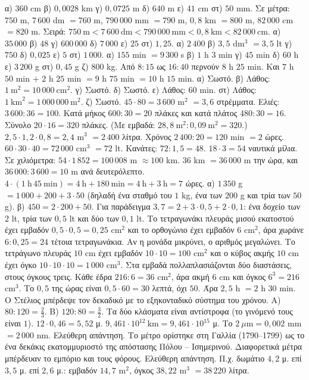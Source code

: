  α) $360$ cm \quad β) $0{,}0028$ km \quad γ) $0{,}0725$ m \quad δ) $640$ m \quad ε) $41$ cm \quad στ) $50$ mm.
 Σε μέτρα: $750$ m, $7\,600$ dm $=760$ m, $790\,000$ mm $=790$ m, $0{,}8$ km $=800$ m, $82\,000$ cm $=820$ m. Σειρά: $750\ \mathrm{m}<7\,600\ \mathrm{dm}<790\,000\ \mathrm{mm}<0{,}8\ \mathrm{km}<82\,000\ \mathrm{cm}$.
 α) $35\,000$ \quad β) $48$ \quad γ) $600\,000$ \quad δ) $7\,000$ \quad ε) $25$ \quad στ) $1{,}25$.
 α) $2\,400$ \quad β) $3{,}5$ dm$^3$ $=3{,}5$ lt \quad γ) $750$ \quad δ) $0{,}025$ \quad ε) $5$ \quad στ) $1\,000$.
 α) $155$ min $=9\,300$ s \quad β) $1$ h $3$ min \quad γ) $45$ min \quad δ) $60$ h \quad ε) $3\,200$ g \quad στ) $0{,}45$ g \quad ζ) $800$ kg.
 Από $8{:}15$ ως $16{:}40$ περνούν $8$ h $25$ min. Και $7$ h $50$ min $+$ $2$ h $25$ min $=9$ h $75$ min $=10$ h $15$ min.
 α) Σωστό. β) Λάθος: $1\ \mathrm{m}^2=10\,000\ \mathrm{cm}^2$. γ) Σωστό. δ) Σωστό. ε) Λάθος: $60$ min. στ) Λάθος: $1\ \mathrm{km}^2=1\,000\,000\ \mathrm{m}^2$. ζ) Σωστό.
 $45\cdot80=3\,600$ m$^2$ $=3{,}6$ στρέμματα. Ελιές: $3\,600:36=100$.
 Κατά μήκος $600:30=20$ πλάκες και κατά πλάτος $480:30=16$. Σύνολο $20\cdot16=320$ πλάκες. (Με εμβαδά: $28{,}8\ \mathrm{m}^2:0{,}09\ \mathrm{m}^2=320$.)
 $2{,}5\cdot1{,}2\cdot0{,}8=2{,}4$ m$^3$ $=2\,400$ λίτρα. Χρόνος $2\,400:20=120$ min $=2$ ώρες.
 $60\cdot30\cdot40=72\,000$ cm$^3$ $=72$ lt. Κανάτες: $72:1{,}5=48$.
 $18\cdot3=54$ ναυτικά μίλια. Σε χιλιόμετρα: $54\cdot1\,852=100\,008$ m $\approx100$ km.
 $36$ km $=36\,000$ m την ώρα, και $36\,000:3\,600=10$ m ανά δευτερόλεπτο.
 $4\cdot(1\ \mathrm{h}\,45\ \mathrm{min})=4\ \mathrm{h}+180\ \mathrm{min}=4\ \mathrm{h}+3\ \mathrm{h}=7$ ώρες.
 α) $1\,350$ g $=1\,000+200+3\cdot50$ (δηλαδή ένα σταθμό του $1$ kg, ένα των $200$ g και τρία των $50$ g). β) $450=2\cdot200+50$.
 Για παράδειγμα $3{,}7=2+3\cdot0{,}5+2\cdot0{,}1$: ένα δοχείο των $2$ lt, τρία των $0{,}5$ lt και δύο των $0{,}1$ lt.
 Το τετραγωνάκι πλευράς μισού εκατοστού έχει εμβαδόν $0{,}5\cdot0{,}5=0{,}25$ cm$^2$ και το ορθογώνιο έχει εμβαδόν $6$ cm$^2$, άρα χωράνε $6:0{,}25=24$ τέτοια τετραγωνάκια. Αν η μονάδα μικρύνει, ο αριθμός μεγαλώνει.
 Το τετράγωνο πλευράς $10$ cm έχει εμβαδόν $10\cdot10=100$ cm$^2$ και ο κύβος ακμής $10$ cm έχει όγκο $10\cdot10\cdot10=1\,000$ cm$^3$. Στα εμβαδά πολλαπλασιάζονται δύο διαστάσεις, στους όγκους τρεις.
 Κάθε έδρα $216:6=36$ cm$^2$, άρα ακμή $6$ cm και όγκος $6^3=216$ cm$^3$.
 Το $0{,}5$ της ώρας είναι $0{,}5\cdot60=30$ λεπτά, όχι $50$. Άρα $2{,}5$ h $=2$ h $30$ min. Ο Στέλιος μπέρδεψε τον δεκαδικό με το εξηκονταδικό σύστημα του χρόνου.
 Α) $80:120=\frac{2}{3}$. Β) $120:80=\frac{3}{2}$. Τα δύο κλάσματα είναι αντίστροφα (το γινόμενό τους είναι $1$).
 $12\cdot0{,}46=5{,}52$ μ.
 $9{,}461\cdot10^{12}\ \mathrm{km}=9{,}461\cdot10^{15}$ μ. Το $2\ \mu\mathrm{m}=0{,}002$ mm $=2\,000$ nm.
 Ελεύθερη απάντηση. Το μέτρο ορίστηκε στη Γαλλία (1790--1799) ως το ένα δεκάκις εκατομμυριοστό της απόστασης Πόλου -- Ισημερινού. Διαφορετικά μέτρα μπέρδευαν το εμπόριο και τους φόρους.
 Ελεύθερη απάντηση. Π.χ. δωμάτιο $4{,}2$ μ. επί $3{,}5$ μ. επί $2{,}6$ μ.: εμβαδόν $14{,}7$ m$^2$, όγκος $38{,}22$ m$^3$ $=38\,220$ λίτρα.
